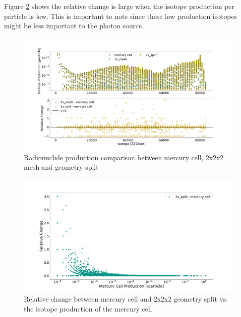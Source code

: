 Figure \ref{fig:1prod_cell_2x_rc} shows the relative change is large when the
isotope production per particle is low. This is important to note since these
low production isotopes might be less important to the photon source.
%
\begin{figure}[H]
	\centering
	\includegraphics[scale=0.42,trim={2cm 1cm 3cm 2cm},clip]{../figs/toy_p1/prod_VPI_2x.pdf}
	\caption{Radionuclide production comparison between mercury cell, 2x2x2 mesh and geometry split}
	\label{fig:1prod_cell_2x}
\end{figure}
%
\begin{figure}[H]
 \centering
 \includegraphics[scale=0.4,trim={3cm 0.5cm 3cm 3cm},clip]{../figs/toy_p1/prod_VPI_rc_2x_split.pdf}
 \caption{Relative change between mercury cell and 2x2x2 geometry split vs. the isotope production of the mercury cell}
 \label{fig:1prod_cell_2x_rc}
\end{figure}


